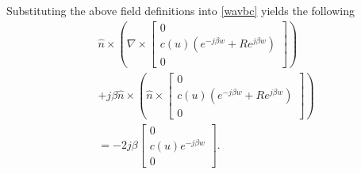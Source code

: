 Substituting the above field definitions into \ref{wavbc} yields the following
\begin{multline}
    \hat{n} \times \left(\nabla \times \begin{bmatrix}
        0 \\
        c(u)(e^{-j\beta w}+Re^{j\beta w})\\
        0
    \end{bmatrix}\right) \\ +j\beta\hat{n}\times\left(\hat{n} \times \begin{bmatrix}
        0 \\
        c(u)(e^{-j\beta w}+Re^{j\beta w})\\
        0
    \end{bmatrix}\right) \\ =-2j\beta\begin{bmatrix}
        0 \\
        c(u)e^{-j\beta w}\\
        0
    \end{bmatrix}.
    \label{wavbcvec}
\end{multline}

